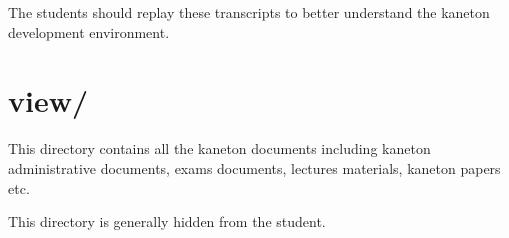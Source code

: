 The students should replay these transcripts to better understand
the kaneton development environment.

%
%

\section{view/}

This directory contains all the kaneton documents including kaneton
administrative documents, exams documents, lectures materials,
kaneton papers etc.

This directory is generally hidden from the student.
